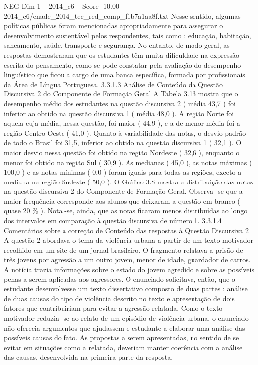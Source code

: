 \begin{textsample}{NEG Dim 1 – 2014\_c6 – Score -10.00 – 2014\_c6/enade\_2014\_tec\_red\_comp\_f1b7a1aa8f.txt}
Nesse sentido, algumas políticas públicas foram mencionadas apropriadamente para assegurar o desenvolvimento sustentável pelos respondentes, tais como : educação, habitação, saneamento, saúde, transporte e segurança.
No entanto, de modo geral, as respostas demostraram que os estudantes têm muita dificuldade na expressão escrita do pensamento, como se pode constatar pela avaliação do desempenho linguístico que ficou a cargo de uma banca específica, formada por profissionais da Área de Língua Portuguesa. 3.3.1.3 Análise de Conteúdo da Questão Discursiva 2 do Componente de Formação Geral A Tabela 3.13 mostra que o desempenho médio dos estudantes na questão discursiva 2 ( média 43,7 ) foi inferior ao obtido na questão discursiva 1 ( média 48,0 ).
A região Norte foi aquela cuja média, nessa questão, foi maior ( 44,9 ), e a de menor média foi a região Centro-Oeste ( 41,0 ).
Quanto à variabilidade das notas, o desvio padrão de todo o Brasil foi 31,5, inferior ao obtido na questão discursiva 1 ( 32,1 ).
O maior desvio nessa questão foi obtido na região Nordeste ( 32,6 ), enquanto o menor foi obtido na região Sul ( 30,9 ).
As medianas ( 45,0 ), as notas máximas ( 100,0 ) e as notas mínimas ( 0,0 ) foram iguais para todas as regiões, exceto a mediana na região Sudeste ( 50,0 ).
O Gráfico 3.8 mostra a distribuição das notas na questão discursiva 2 do Componente de Formação Geral.
Observa -se que a maior frequência corresponde aos alunos que deixaram a questão em branco ( quase 20 \% ).
Nota -se, ainda, que as notas ficaram menos distribuídas ao longo dos intervalos em comparação à questão discursiva de número 1. 3.3.1.4 Comentários sobre a correção de Conteúdo das respostas à Questão Discursiva 2 A questão 2 abordava o tema da violência urbana a partir de um texto motivador recolhido em um site de um jornal brasileiro.
O fragmento relatava a prisão de três jovens por agressão a um outro jovem, menor de idade, guardador de carros.
A notícia trazia informações sobre o estado do jovem agredido e sobre as possíveis penas a serem aplicadas aos agressores.
O enunciado solicitava, então, que o estudante desenvolvesse um texto dissertativo composto de duas partes : análise de duas causas do tipo de violência descrito no texto e apresentação de dois fatores que contribuiriam para evitar a agressão relatada.
Como o texto motivador reduzia -se ao relato de um episódio de violência urbana, o enunciado não oferecia argumentos que ajudassem o estudante a elaborar uma análise das possíveis causas do fato.
As propostas a serem apresentadas, no sentido de se evitar em situações como a relatada, deveriam manter coerência com a análise das causas, desenvolvida na primeira parte da resposta.

\end{textsample}
